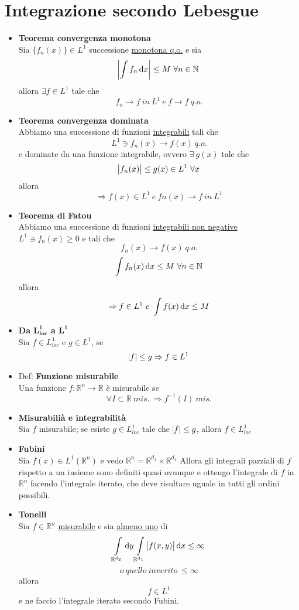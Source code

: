 \documentclass[a4paper,portrait,columns=3,5pt]{cheatsheet}
\begin{document}
\section{Integrazione secondo Lebesgue}
\begin{itemize}
    \item \textbf{Teorema convergenza monotona} \\ Sia $\{ f_n(x) \} \in L^1$ successione \underline{monotona q.o.} e sia $$\abs{\int f_n \dif x} \leq M~\forall n \in \mathbb{N}$$ allora $ \exists f \in L^1$ tale che $$f_n \rightarrow f~ in~ L^1~e~f\rightarrow f~q.o.$$
    \item \textbf{Teorema convergenza dominata}\\ Abbiamo una successione di funzioni \underline{integrabili} tali che $$ L^1 \ni f_n(x) \rightarrow f(x)~q.o.$$ e dominate da una funzione integrabile, ovvero $\exists~g(x)$ tale che $$ \abs{f_n(x)} \leq g(x) \in L^1~\forall x$$ allora $$\Rightarrow f(x) \in L^1 ~ e ~ fn(x) \rightarrow f~in~L^1$$
    \item \textbf{Teorema di Fatou}\\ Abbiamo una successione di funzioni \underline{integrabili non negative} $L^1 \ni f_n(x) \geq 0$ e tali che $$f_n(x) \rightarrow f(x)~q.o.$$ $$\int f_n(x) \dif x \leq M~\forall n\in \mathbb{N}$$ allora $$ \Rightarrow f\in L^1~e~\int f(x) \dif x \leq M$$ 
    \item \textbf{Da $\mathbf{L^1_{loc}}$ a $\mathbf{L^1}$}\\Sia $f\in L^1_{loc}$ e $g\in L^1$, se $$\abs{f} \leq g \Rightarrow f\in L^1$$
    \item Def: \textbf{Funzione misurabile} \\ Una funzione $f:\mathbb{R}^n \rightarrow \mathbb{R}$ è misurabile se $$\forall I\subset \mathbb{R}~mis.~ \Rightarrow f^{-1}(I)~mis.$$ 
    \item \textbf{Misurabilià e integrabilità}\\ Sia $f$ misurabile; se esiste $g\in L^1_{loc}$ tale che $\abs{f} \leq g$, allora $f\in L^1_{loc}$
    \item \textbf{Fubini}\\ Sia $f(x) \in L^1(\mathbb{R}^n)$ e vedo $\mathbb{R}^n = \mathbb{R}^{d_1} \times \mathbb{R}^{d_1}$ Allora gli integrali parziali di $f$ rispetto a un insieme sono definiti quasi ovunque e ottengo l'integrale di $f$ in $\mathbb{R}^{n}$ facendo l'integrale iterato, che deve risultare uguale in tutti gli ordini possibili.
    \item \textbf{Tonelli}\\ Sia $f\in \mathbb{R}^n$ \underline{misurabile} e sia \underline{almeno uno} di $$ \int \limits_{\mathbb{R}^{d_2}} \dif y \int \limits_{\mathbb{R}^{d_1}} \abs{f(x, y)} \dif x \leq \infty $$ $$o~quello~inverito~\leq \infty$$ allora $$f\in L^1$$ e ne faccio l'integrale iterato secondo Fubini.
\end{itemize}
\end{document}
